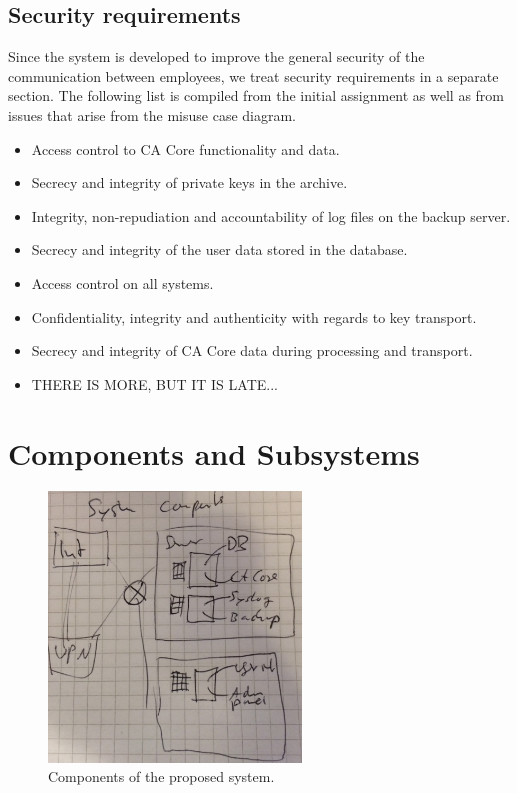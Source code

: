 \documentclass[a4paper, toc=index, 12pt, DIV14, twoside, BCOR2cm, headsepline, numbers=noenddot, bibliography=totoc]{scrbook}
\begin{document}
\subsection{Security requirements}
Since the system is developed to improve the general security of the communication between employees, we treat security requirements in a separate section. The following list is compiled from the initial assignment as well as from issues that arise from the misuse case diagram.
\begin{itemize}
\item Access control to CA Core functionality and data.
\item Secrecy and integrity of private keys in the archive.
\item Integrity, non-repudiation and accountability of log files on the backup server.
\item Secrecy and integrity of the user data stored in the database.
\item Access control on all systems.
\item Confidentiality, integrity and authenticity with regards to key transport.
\item Secrecy and integrity of CA Core data during processing and transport.
\item THERE IS MORE, BUT IT IS LATE...
\end{itemize}

\section{Components and Subsystems}
\begin{figure}[H]
  \centering
    \includegraphics[width=0.6\textwidth]{images/systemcomponents.jpg}  
  \caption{Components of the proposed system.}
  \label{systemcomponents}
\end{figure}
\end{document}
